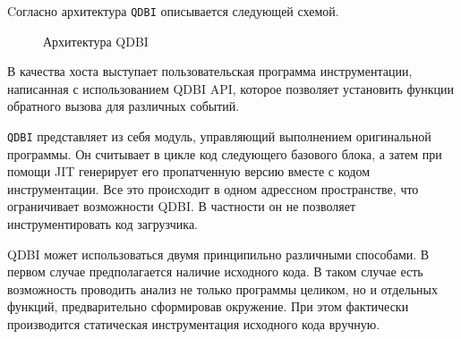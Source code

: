 Cогласно \cite{QDBI} архитектура \texttt{QDBI} описывается следующей схемой.
\begin{figure}[H]
    \caption{Архитектура QDBI}
    \label{fig:qdbi}
\end{figure}

В качества хоста выступает пользовательская программа инструментации, написанная с использованием QDBI API, которое позволяет установить функции обратного вызова для различных событий.

\texttt{QDBI} представляет из себя модуль, управляющий выполнением оригинальной программы. Он считывает в цикле код следующего базового блока, а затем при помощи JIT генерирует его пропатченную версию вместе с кодом инструментации. Все это происходит в одном адрессном пространстве, что ограничивает возможности QDBI. В частности он не позволяет инструментировать код загрузчика.

QDBI может использоваться двумя принципильно различными способами. В первом случае предполагается наличие исходного кода. В таком случае есть возможность проводить анализ не только программы целиком, но и отдельных функций, предварительно сформировав окружение. При этом фактически производится статическая инструментация исходного кода вручную.

